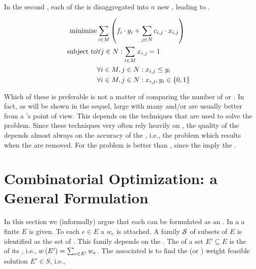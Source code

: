 \paragraph{}
In the second , each of the  is disaggregated into $n$ new , leading to  .

\begin{eqnarray}
\mbox{minimize}&\sumdomain[i]{M}{\brak{f_i\cdot y_i+\sumdomain[j]{N}{c_{i,j}\cdot x_{i,j}}}}\eqnlab{ufl-mb}\\
\mbox{subject to}&\forall j\in N:\sumdomain[i]{M}{x_{i,j}}=1\eqnlab{ufl-cb1}\\
&\forall i\in M,j\in N:x_{i,j}\leq y_i\eqnlab{ufl-cb2}\\
&\forall i\in M,j\in N:x_{i,j},y_i\in\accl{0,1}\eqnlab{ufl-cb3}
\end{eqnarray}

Which of these  is preferable is not a matter of comparing the number of  or . In fact, as will be shown in the sequel, large  with many  and/or  are usually better from a 's point of view. This depends on the techniques that are used to solve the problem. Since these techniques very often rely heavily on , the quality of the  depends almost always on the accuracy of the , i.e., the problem which results when the  are removed. For the  problem   is better than , since the   imply the  .

\section{Combinatorial Optimization: a General Formulation}
In this section we (informally) argue that each  can be formulated as an . In a  a finite  $E$ is given. To each  $e\in E$ a  $w_e$ is attached. A family $\calS$ of subsets of $E$ is identified as the set of . This family depends on the . The  of a set $E'\subseteq E$ is the  of its , i.e., $\fun{w}{E'}=\isumdomain[e]{E'}{w_e}$. The associated  is to find the  (or ) weight feasible solution $E'\in S$, i.e.,

